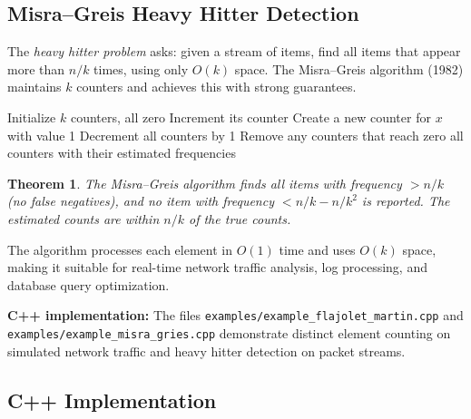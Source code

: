 \documentclass[twoside,12pt]{book}
\theoremstyle{plain}
\newtheorem{theorem}{Theorem}[chapter]
\theoremstyle{definition}
\theoremstyle{remark}
\newenvironment{cpplisting}{\begin{center}\small}{\end{center}}
\begin{document}
\subsection{Misra--Greis Heavy Hitter Detection}

The \emph{heavy hitter problem} asks: given a stream of items, find all items that appear more than $n/k$ times, using only $O(k)$ space. The Misra--Greis algorithm (1982) maintains $k$ counters and achieves this with strong guarantees.

\begin{algorithm}[htbp]
\caption{Misra--Greis Heavy Hitter Detection}
\label{alg:misra-gries}
\begin{algorithmic}[1]
  \State Initialize $k$ counters, all zero
      \State Increment its counter
      \State Create a new counter for $x$ with value 1
    \Else
      \State Decrement all counters by 1
      \State Remove any counters that reach zero
    \EndIf
  \EndFor
  \State \Return all counters with their estimated frequencies
\EndFunction
\end{algorithmic}
\end{algorithm}

\begin{theorem}\label{thm:misra-gries}
The Misra--Greis algorithm finds all items with frequency $> n/k$ (no false negatives), and no item with frequency $< n/k - n/k^2$ is reported. The estimated counts are within $n/k$ of the true counts.
\end{theorem}

The algorithm processes each element in $O(1)$ time and uses $O(k)$ space, making it suitable for real-time network traffic analysis, log processing, and database query optimization.

\begin{cpplisting}
\textbf{C++ implementation:} The files \texttt{examples/example\_flajolet\_martin.cpp} and \texttt{examples/example\_misra\_gries.cpp} demonstrate distinct element counting on simulated network traffic and heavy hitter detection on packet streams.
\end{cpplisting}


\subsection*{C++ Implementation}
\end{document}
